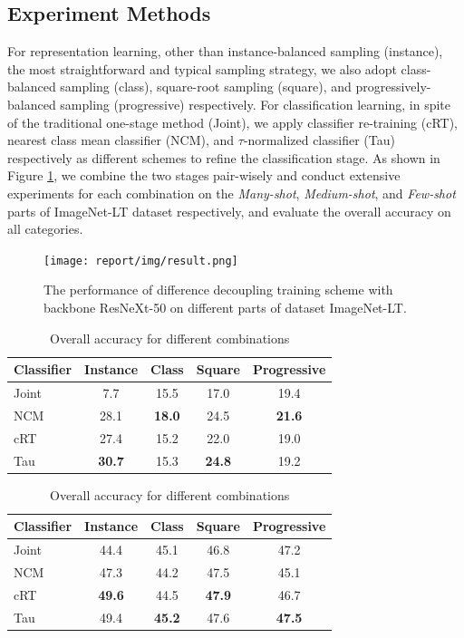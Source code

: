\documentclass{article}
\begin{document}
\subsection{Experiment Methods}

For representation learning, other than instance-balanced sampling (instance), the most straightforward and typical sampling strategy, we also adopt class-balanced sampling (class), square-root sampling (square), and progressively-balanced sampling (progressive) respectively. For classification learning, in spite of the traditional one-stage method (Joint), we apply classifier re-training (cRT), nearest class mean classifier (NCM), and $\tau$-normalized classifier (Tau) respectively as different schemes to refine the classification stage. As shown in Figure \ref{fig3}, we combine the two stages pair-wisely and conduct extensive experiments for each combination on the \textit{Many-shot}, \textit{Medium-shot}, and \textit{Few-shot} parts of ImageNet-LT dataset respectively, and evaluate the overall accuracy on all categories.

\begin{figure}[t]
    \centering
    \texttt{[image: report/img/result.png]}
    \caption{The performance of difference decoupling training scheme with backbone ResNeXt-50 on different parts of dataset ImageNet-LT.}
    \label{fig3}
\end{figure}

\begin{table}
    \caption{Few-shot scenario accuracy for different combinations}
    \label{tab1}
    \centering
    \begin{tabular}{lcccc}
    \toprule
    Classifier     & Instance  & Class & Square & Progressive \\
    \midrule
    Joint          & 7.7       & 15.5  & 17.0   & 19.4        \\
    NCM            & 28.1      & \textbf{18.0}  & 24.5   & \textbf{21.6}        \\
    cRT            & 27.4      & 15.2  & 22.0   & 19.0        \\
    Tau            & \textbf{30.7}      & 15.3  & \textbf{24.8}   & 19.2        \\
    \bottomrule
    \end{tabular}
    \quad
    \caption{Overall accuracy for different combinations}
    \label{tab2}
    \centering
    \begin{tabular}{lcccc}
    \toprule
    Classifier     & Instance  & Class & Square & Progressive \\
    \midrule
    Joint          & 44.4       & 45.1  & 46.8   & 47.2       \\
    NCM            & 47.3      & 44.2  & 47.5   & 45.1        \\
    cRT            & \textbf{49.6}      & 44.5  & \textbf{47.9}   & 46.7        \\
    Tau            & 49.4      & \textbf{45.2}  & 47.6   & \textbf{47.5}        \\
    \bottomrule
    \end{tabular}
\end{table}
\end{document}
